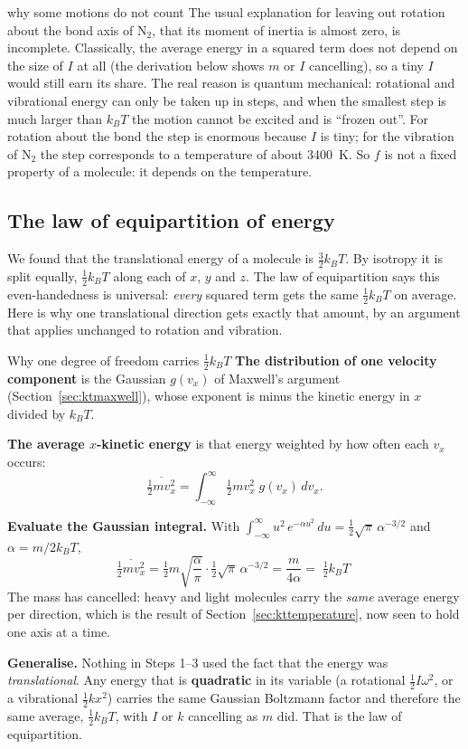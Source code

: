 \begin{trapbox}{why some motions do not count}
The usual explanation for leaving out rotation about the bond axis of N$_2$, that its moment of inertia is
almost zero, is incomplete. Classically, the average energy in a squared term does not depend on the size
of $I$ at all (the derivation below shows $m$ or $I$ cancelling), so a tiny $I$ would still earn its share.
The real reason is quantum mechanical: rotational and vibrational energy can only be taken up in steps,
and when the smallest step is much larger than $k_BT$ the motion cannot be excited and is ``frozen out''.
For rotation about the bond the step is enormous because $I$ is tiny; for the vibration of N$_2$ the step
corresponds to a temperature of about \SI{3400}{K}. So $f$ is not a fixed property of a molecule: it
depends on the temperature.
\end{trapbox}

\subsection{The law of equipartition of energy}

We found that the translational energy of a molecule is $\tfrac32 k_BT$. By isotropy it is split equally,
$\tfrac12 k_BT$ along each of $x$, $y$ and $z$. The law of equipartition says this even-handedness is
universal: \emph{every} squared term gets the same $\tfrac12 k_BT$ on average. Here is why one
translational direction gets exactly that amount, by an argument that applies unchanged to rotation and
vibration.

\begin{derivbox}{Why one degree of freedom carries $\tfrac12 k_BT$}
 \textbf{The distribution of one velocity component} is the Gaussian $g(v_x)$ of Maxwell's
argument (Section~\ref{sec:ktmaxwell}), whose exponent is minus the kinetic energy in $x$ divided by
$k_BT$.

 \textbf{The average $x$-kinetic energy} is that energy weighted by how often each $v_x$
occurs:
\[
\overline{\tfrac12 m v_x^2}
= \int_{-\infty}^{\infty} \tfrac12 m v_x^2\; g(v_x)\,dv_x .
\]

 \textbf{Evaluate the Gaussian integral.} With
$\int_{-\infty}^{\infty} u^2\,e^{-\alpha u^2}\,du = \tfrac12\sqrt{\pi}\,\alpha^{-3/2}$ and
$\alpha = m/2k_BT$,
\[
\overline{\tfrac12 m v_x^2}=\tfrac12 m\sqrt{\frac{\alpha}{\pi}}\cdot\tfrac12\sqrt\pi\,\alpha^{-3/2}
=\frac{m}{4\alpha}=
\boxed{\;\tfrac12 k_BT\;}
\]
The mass has cancelled: heavy and light molecules carry the \emph{same} average energy per direction,
which is the result of Section~\ref{sec:kttemperature}, now seen to hold one axis at a time.

 \textbf{Generalise.} Nothing in Steps 1--3 used the fact that the energy was
\emph{translational}. Any energy that is \textbf{quadratic} in its variable (a rotational $\tfrac12
I\omega^2$, or a vibrational $\tfrac12 k x^2$) carries the same Gaussian Boltzmann factor and therefore
the same average, $\tfrac12 k_BT$, with $I$ or $k$ cancelling as $m$ did. That is the law of
equipartition.
\end{derivbox}

